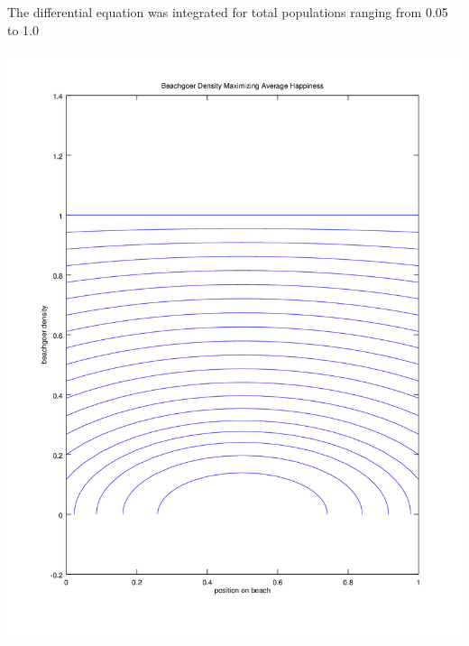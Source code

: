 \documentclass{article}
\begin{document}
The differential equation was integrated for total populations ranging from 
	0.05 to 1.0

\includegraphics[width=\textwidth]{dictator-distributions.png}
\end{document}
